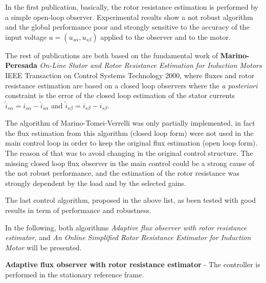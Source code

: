 \documentclass[12pt,a4paper]{scrartcl}
\begin{document}
\begin{onehalfspace}
In the first publication, basically, the rotor resistance estimation is performed by a simple open-loop observer. Experimental results show a not robust algorithm and the global performance poor and strongly sensitive to the accuracy of the input voltage $u = \left(u_{s\alpha}, u_{s\beta}\right)$ applied to the observer and to the motor.

The rest of publications are both based on the fundamental work of \textbf{Marino-Peresada} \textit{On-Line Stator and Rotor Resistance Estimation for Induction Motors} IEEE Transaction on Control Systems Technology 2000, where fluxes and rotor resistance estimation are based on a closed loop observers where the \textit{a posteriori} constraint is the error of the closed loop estimation of the stator currents $\tilde{i}_{s\alpha} = i_{s\alpha} - \hat{i}_{s\alpha}$ and $\tilde{i}_{s\beta} = i_{s\beta} - \hat{i}_{s\beta}$.

The algorithm of Marino-Tomei-Verrelli was only partially implemented, in fact the flux estimation from this algorithm (closed loop form) were not used in the main control loop in order to keep the original flux estimation (open loop form). The reason of that was to avoid changing in the original control structure. The missing closed loop flux observer in the main control could be a strong cause of the not robust performance, and the estimation of the rotor resistance was strongly dependent by the load and by the selected gains.

The last control algorithm, proposed in the above list, as been tested with good results in term of performance and robustness. 

In the following, both algorithms \textit{Adaptive flux observer with rotor resistance estimator}, and \textit{An Online Simplified Rotor Resistance Estimator for Induction Motor} will be presented.

\newpage
\begin{mybox}
	\textbf{Adaptive flux observer with rotor resistance estimator} - The controller is performed in the stationary reference frame.


\end{mybox}
\end{onehalfspace}
\end{document}

